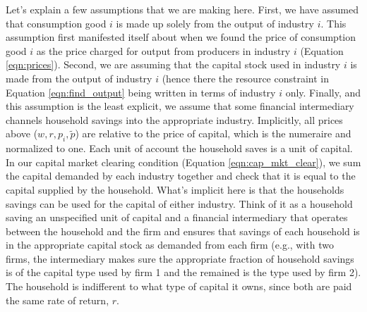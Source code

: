 \documentclass[letterpaper,12pt]{article}
\theoremstyle{definition}
\begin{document}
\begin{spacing}{1.5}
Let's explain a few assumptions that we are making here.  First, we have assumed that consumption good $i$ is made up solely from the output of industry $i$.  This assumption first manifested itself about when we found the price of consumption good $i$ as the price charged for output from producers in industry $i$ (Equation \ref{eqn:prices}).  Second, we are assuming that the capital stock used in industry $i$ is made from the output of industry $i$ (hence there the resource constraint in Equation \ref{eqn:find_output} being written in terms of industry $i$ only.  Finally, and this assumption is the least explicit, we assume that some financial intermediary channels household savings into the appropriate industry.  Implicitly, all prices above ($w, r, p_{i}, \tilde{p}$) are relative to the price of capital, which is the numeraire and normalized to one.  Each unit of account the household saves is a unit of capital.  In our capital market clearing condition (Equation \ref{eqn:cap_mkt_clear}), we sum the capital demanded by each industry together and check that it is equal to the capital supplied by the household.  What's implicit here is that the households savings can be used for the capital of either industry.  Think of it as a household saving an unspecified unit of capital and a financial intermediary that operates between the household and the firm and ensures that savings of each household is in the appropriate capital stock as demanded from each firm (e.g., with two firms, the intermediary makes sure the appropriate fraction of household savings is of the capital type used by firm 1 and the remained is the type used by firm 2).  The household is indifferent to what type of capital it owns, since both are paid the same rate of return, $r$.

%
%
%


\end{spacing}
\end{document}
